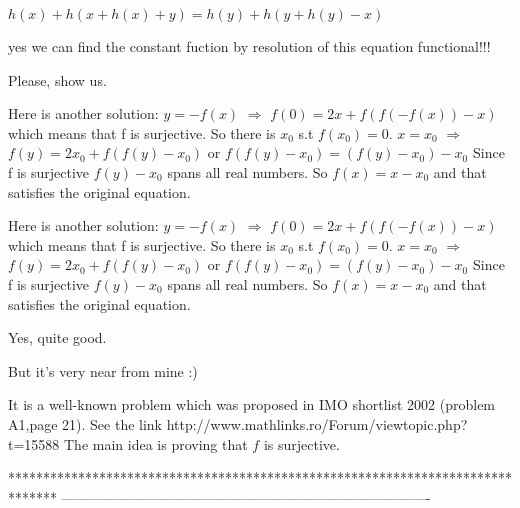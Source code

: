\begin{solution}
	\begin{tcolorbox}$ h(x) + h(x + h(x) + y) = h(y) + h(y + h(y) - x)$

yes we can find the constant fuction by resolution of this equation functional!!!\end{tcolorbox}

Please, show us.
\end{solution}



\begin{solution}
	Here is another solution:
$ y=-f(x)$ $ \Longrightarrow$ $ f(0)=2x+f(f(-f(x))-x)$ which means that f is surjective.
So there is $ x_0$ s.t $ f(x_0)=0.$
$ x=x_0$ $ \Longrightarrow$ $ f(y)=2x_0+f(f(y)-x_0)$ or
$ f(f(y)-x_0)=(f(y)-x_0)-x_0$ Since f is surjective $ f(y)-x_0$ spans all real numbers.
So $ f(x)=x-x_0$ and that satisfies the original equation.
\end{solution}



\begin{solution}
	\begin{tcolorbox}Here is another solution:
$ y = - f(x)$ $ \Longrightarrow$ $ f(0) = 2x + f(f( - f(x)) - x)$ which means that f is surjective.
So there is $ x_0$ s.t $ f(x_0) = 0.$
$ x = x_0$ $ \Longrightarrow$ $ f(y) = 2x_0 + f(f(y) - x_0)$ or
$ f(f(y) - x_0) = (f(y) - x_0) - x_0$ Since f is surjective $ f(y) - x_0$ spans all real numbers.
So $ f(x) = x - x_0$ and that satisfies the original equation.\end{tcolorbox}

Yes, quite good.

But it's very near from mine :)
\end{solution}



\begin{solution}
	It is a well-known  problem which was proposed in IMO shortlist 2002 (problem A1,page 21). See the link http://www.mathlinks.ro/Forum/viewtopic.php?t=15588
The main idea is proving that $ f$ is surjective.
\end{solution}
*******************************************************************************
-------------------------------------------------------------------------------

